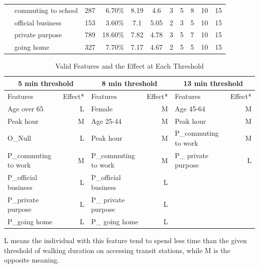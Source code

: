 \documentclass[Journal,letterpaper]{ascelike-new}
\begin{document}
\begin{table}[htbp]
\begin{tabular}{llrrccccccc}
 & commuting to school & 287   &  6.70\% & 8.19  & 4.6   & 3     & 5     & 8     & 10    & 15 \\
 & official business   & 153   &  3.60\% & 7.1   & 5.05  & 2     & 3     & 5     & 10    & 15 \\
 & private purpose     & 789   & 18.60\% & 7.82  & 4.78  & 3     & 5     & 7     & 10    & 15 \\
 & going home          & 327   &  7.70\% & 7.17  & 4.67  & 2     & 5     & 5     & 10    & 15 \\
%
        \hline\hline
    \end{tabular}
    \normalsize
\end{table}

%
\begin{table}[htbp]
    \caption{Valid Features and the Effect at Each Threshold}
    \label{table:3}
    \centering
    \begin{tabular}{lrlrlr}
    \hline\hline
    \multicolumn{2}{c}{5 min threshold} & \multicolumn{2}{c}{8 min threshold} & \multicolumn{2}{c}{13 min threshold} \\
    \hline
Features 	& Effect* 	& Features 	& Effect*		& Features 	& Effect* \\
Age over 65 			& L	& Female				& M	& Age 45-64				& M	\\
Peak hour				& M	& Age 25-44 			& M	& Peak hour 			& M	\\
O\_Null					& L	& Peak hour				& M	& P\_commuting to work 	& M \\
P\_commuting to work	& M	& P\_commuting to work  & M	& P\_ private purpose 	& L \\
P\_official business	& L & P\_official business	& L	&       				&  	\\
P\_private purpose		& L & P\_ private purpose	& L &       				&  	\\
P\_going home 			& L & P\_ going home 		& L &       				&   \\
    \hline\hline
    \end{tabular}
    \normalsize
%
    \begin{description}
        \label{note:1}
        \item[*Note:]
L means the individual with this feature tend to spend less time than the given threshold of walking duration on accessing transit stations, while M is the opposite meaning.
        \end{description}
\end{table}
\end{document}
